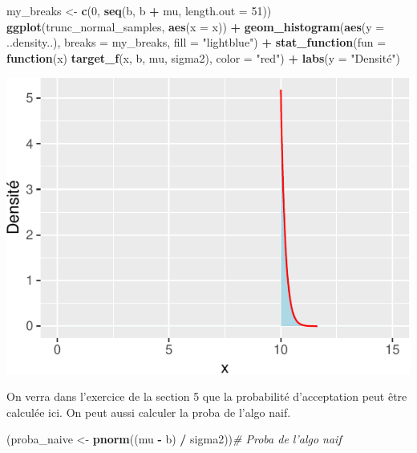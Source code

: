 \documentclass[]{article}
\newenvironment{Shaded}{\begin{snugshade}}{\end{snugshade}}
\newcommand{\CommentTok}[1]{\textcolor[rgb]{0.56,0.35,0.01}{\textit{#1}}}
\newcommand{\ControlFlowTok}[1]{\textcolor[rgb]{0.13,0.29,0.53}{\textbf{#1}}}
\newcommand{\DataTypeTok}[1]{\textcolor[rgb]{0.13,0.29,0.53}{#1}}
\newcommand{\DecValTok}[1]{\textcolor[rgb]{0.00,0.00,0.81}{#1}}
\newcommand{\KeywordTok}[1]{\textcolor[rgb]{0.13,0.29,0.53}{\textbf{#1}}}
\newcommand{\NormalTok}[1]{#1}
\newcommand{\OperatorTok}[1]{\textcolor[rgb]{0.81,0.36,0.00}{\textbf{#1}}}
\newcommand{\StringTok}[1]{\textcolor[rgb]{0.31,0.60,0.02}{#1}}
\begin{document}
\begin{Shaded}
\begin{Highlighting}[]
\NormalTok{my_breaks <-}\StringTok{ }\KeywordTok{c}\NormalTok{(}\DecValTok{0}\NormalTok{, }\KeywordTok{seq}\NormalTok{(b, b }\OperatorTok{+}\StringTok{ }\NormalTok{mu, }\DataTypeTok{length.out =} \DecValTok{51}\NormalTok{))}
\KeywordTok{ggplot}\NormalTok{(trunc_normal_samples, }\KeywordTok{aes}\NormalTok{(}\DataTypeTok{x =}\NormalTok{ x)) }\OperatorTok{+}
\StringTok{  }\KeywordTok{geom_histogram}\NormalTok{(}\KeywordTok{aes}\NormalTok{(}\DataTypeTok{y =}\NormalTok{ ..density..), }\DataTypeTok{breaks =}\NormalTok{ my_breaks,}
                 \DataTypeTok{fill =} \StringTok{"lightblue"}\NormalTok{) }\OperatorTok{+}
\StringTok{  }\KeywordTok{stat_function}\NormalTok{(}\DataTypeTok{fun =} \ControlFlowTok{function}\NormalTok{(x) }\KeywordTok{target_f}\NormalTok{(x, b, mu, sigma2), }\DataTypeTok{color =} \StringTok{"red"}\NormalTok{) }\OperatorTok{+}
\StringTok{  }\KeywordTok{labs}\NormalTok{(}\DataTypeTok{y =} \StringTok{"Densité"}\NormalTok{)}
\end{Highlighting}
\end{Shaded}

\begin{center}\includegraphics{correction_simulation_variables_aleatoires_files/figure-latex/representation_graphique-1} \end{center}

On verra dans l'exercice de la section 5 que la probabilité
d'acceptation peut être calculée ici. On peut aussi calculer la proba de
l'algo naif.

\begin{Shaded}
\begin{Highlighting}[]
\NormalTok{(proba_naive <-}\StringTok{ }\KeywordTok{pnorm}\NormalTok{((mu }\OperatorTok{-}\StringTok{ }\NormalTok{b) }\OperatorTok{/}\StringTok{ }\NormalTok{sigma2))}\CommentTok{# Proba de l'algo naif}
\end{Highlighting}
\end{Shaded}
\end{document}
